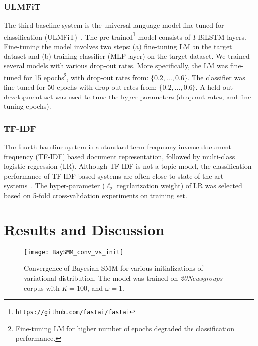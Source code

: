 \documentclass[journal]{IEEEtran}
\begin{document}
\subsubsection{ULMFiT}
The third baseline system is the universal language model fine-tuned for 
classification (ULMFiT)~\cite{Ruder:2018:Universal}.
The pre-trained\footnote{\texttt{\url{https://github.com/fastai/fastai}}} 
model consists of 3 BiLSTM layers. Fine-tuning the model involves two steps: 
(a) fine-tuning LM on the target dataset and (b) training classifier (MLP 
layer) on the target dataset. We trained several models with various drop-out 
rates. More specifically, the LM was fine-tuned for 15 
epochs\footnote{Fine-tuning LM for higher number of epochs degraded the 
classification performance.}, with drop-out rates from: \(\{0.2, \ldots , 0.6\} 
\). The classifier was fine-tuned for 50 epochs with drop-out rates from: 
\(\{0.2,\ldots , 0.6\} \). A held-out development set was used to tune the 
hyper-parameters (drop-out rates, and fine-tuning epochs).

\subsubsection{TF-IDF}
The fourth baseline system is a standard term frequency-inverse document 
frequency (TF-IDF) based document representation, followed by multi-class 
logistic regression (LR). Although TF-IDF is not a topic model, the 
classification performance of TF-IDF based systems are often close to 
state-of-the-art systems~\cite{May:2015:mivec}. The hyper-parameter
(\(\ell_2\) regularization weight) of LR was selected based on 5-fold 
cross-validation experiments on training set.

\section{Results and Discussion}
\label{sec:results}

\begin{figure}[t!]
  \centering
  \texttt{[image: BaySMM\_conv\_vs\_init]}
  \caption{\label{fig:conv} Convergence of Bayesian SMM for various 
    initializations of variational distribution. The model was trained on 
    \textit{20Newsgroups} corpus with \(K = 100\), and \(\omega=1\).}
\end{figure}
\end{document}
